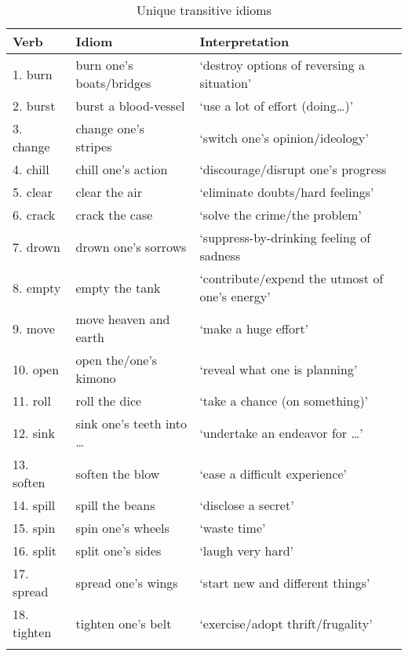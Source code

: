 \documentclass[output=paper]{langsci/langscibook}
\begin{document}
\begin{table}[H]
\small
\caption{Unique transitive idioms}
\begin{tabularx}{\textwidth}{llQ}
\lsptoprule
{Verb} & {Idiom} & {Interpretation} \\
\midrule
{1. burn}  & burn one’s boats/bridges & ‘destroy options of reversing a situation’ \\
{2. burst}  & burst a blood-vessel & ‘use a lot of effort (doing…)’\\
{3. change} & change one’s stripes~ & ‘switch one’s opinion/ideology’ \\
{4. chill}  & chill one’s action & ‘discourage/disrupt one’s progress \\
{5. clear}  & clear the air & ‘eliminate doubts/hard feelings’\\
{6. crack}  & crack the case & ‘solve the crime/the problem’ \\
{7. drown}  & drown one’s sorrows & ‘suppress-by-drinking feeling of sadness\\
{8. empty}  & empty the tank & ‘contribute/expend the utmost of one’s energy’ \\
{9. move}  & move heaven and earth & ‘make a huge effort’ \\
{10. open}  & open the/one’s kimono & ‘reveal what one is planning’\\
{11. roll}  & roll the dice & ‘take a chance (on something)’ \\
{12. sink}  & sink one’s teeth into \dots & ‘undertake an endeavor for \dots’\\
{13. soften}  & soften the blow & ‘ease a difficult experience’ \\
{14. spill}  & spill the beans & ‘disclose a secret’ \\
{15. spin}  & spin one’s wheels & ‘waste time’\\
{16. split}  & split one’s sides & ‘laugh very hard’\\
{17. spread}  & spread one’s wings & ‘start new and different things’  \\
{18. tighten} & tighten one’s belt & ‘exercise/adopt thrift/frugality’\\
\lspbottomrule
\end{tabularx}
\end{table}
\end{document}
